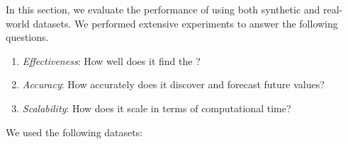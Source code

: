 % 
\TSK{
 
}
\TSK{
 
}
In this section, we evaluate the performance of \method using both synthetic and real-world datasets.
We performed extensive experiments to answer the following questions.
{\setlength{\leftmargini}{17.2pt}
\begin{enumerate}
    \renewcommand{\labelenumi}{\textit{Q\arabic{enumi}.}}
    \item 
    \textit{Effectiveness}: How well does it find the \relation?
    \item 
    \textit{Accuracy}: How accurately does it discover \relation and forecast future values?
    \item 
    \textit{Scalability}: How does it scale in terms of computational time?
\end{enumerate}
}
We used the following datasets:
